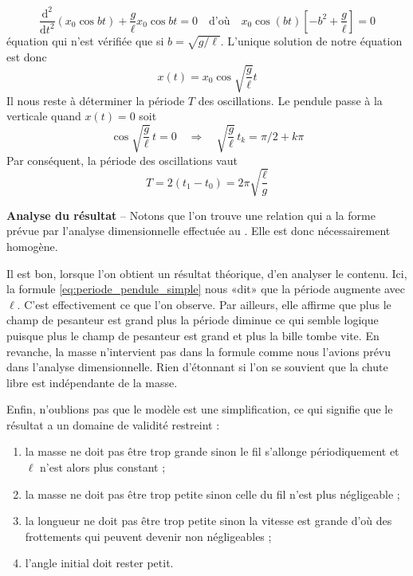 \[\dfrac{\mathrm{d}^2}{\mathrm{d}t^2}(x_0\cos bt)+\dfrac{g}{\ell}x_0\cos bt=0
\quad\text{d'où}\quad
x_0\cos(bt)\left[-b^2+\dfrac{g}{\ell}\right]=0\]
équation qui n'est vérifiée que si $b=\sqrt{g/\ell}$. L'unique solution de notre équation est donc \[x(t)=x_0\cos\sqrt{\frac{g}{\ell}}t\]
Il nous reste à déterminer la période $T$ des oscillations. Le pendule passe à la verticale quand $x(t)=0$ soit
\[\cos\sqrt{\frac{g}{\ell}}\,t=0 
\quad\Longrightarrow\quad \sqrt{\frac{g}{\ell}}\,t_k=\pi/2+k\pi 	\]
Par conséquent, la période des oscillations vaut 
\begin{equation}
	T=2(t_1-t_0)=2\pi\sqrt{\frac{\ell}{g}}
\label{eq:periode_pendule_simple}
\end{equation} 

\textbf{Analyse du résultat} -- Notons que l'on trouve une relation qui a la forme prévue par l'analyse dimensionnelle effectuée au . Elle est donc nécessairement homogène.

Il est bon, lorsque l'on obtient un résultat théorique, d'en analyser le contenu. Ici, la formule \eqref{eq:periode_pendule_simple} nous «dit» que la période augmente avec $\ell$. C'est effectivement ce que l'on observe. Par ailleurs, elle affirme que plus le champ de pesanteur est grand plus la période diminue ce qui semble logique puisque plus le champ de pesanteur est grand et plus la bille tombe vite. En revanche, la masse n'intervient pas dans la formule comme nous l'avions prévu dans l'analyse dimensionnelle. Rien d'étonnant si l'on se souvient que la chute libre est indépendante de la masse.

Enfin, n'oublions pas que le modèle est une simplification, ce qui signifie que le résultat a un domaine de validité restreint :
\begin{enumerate}
	\item la masse ne doit pas être trop grande sinon le fil s'allonge périodiquement et $\ell$ n'est alors plus constant ;
	\item la masse ne doit pas être trop petite sinon celle du fil n'est plus négligeable ;
	\item la longueur ne doit pas être trop petite sinon la vitesse est grande d'où des frottements qui peuvent devenir non négligeables ;
	\item l'angle initial doit rester petit.
\end{enumerate}


